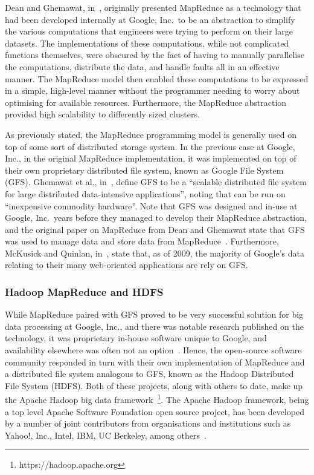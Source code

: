 \documentclass[a4paper,11pt]{article}
\begin{document}
Dean and Ghemawat, in~\cite{dean_mapreduce:_2008}, originally presented MapReduce as a technology that had been
developed internally at Google, Inc.\ to be an abstraction to simplify the various computations that engineers were
trying to perform on their large datasets. The implementations of these computations, while not complicated functions
themselves, were obscured by the fact of having to manually parallelise the computations, distribute the data, and
handle faults all in an effective manner. The MapReduce model then enabled these computations to be expressed in a
simple, high-level manner without the programmer needing to worry about optimising for available resources. Furthermore,
the MapReduce abstraction provided high scalability to differently sized clusters.

As previously stated, the MapReduce programming model is generally used on top of some sort of distributed storage
system. In the previous case at Google, Inc., in the original MapReduce implementation, it was implemented on top of
their own proprietary distributed file system, known as Google File System (GFS). Ghemawat et al.,
in~\cite{ghemawat_google_2003}, define GFS to be a ``scalable distributed file system for large distributed data-intensive
applications'', noting that can be run on ``inexpensive commodity hardware''. Note that GFS was designed and in-use
at Google, Inc.\ years before they managed to develop their MapReduce abstraction, and the original paper on MapReduce
from Dean and Ghemawat state that GFS was used to manage data and store data from MapReduce~\cite{dean_mapreduce:_2008}.
Furthermore, McKusick and Quinlan, in~\cite{mckusick2009gfs}, state that, as of 2009, the majority of Google's data
relating to their many web-oriented applications are rely on GFS.



\subsubsection{Hadoop MapReduce and HDFS} %
\label{ssub:hadoop_mapreduce_and_hdfs}

While MapReduce paired with GFS proved to be very successful solution for big data processing at Google, Inc., and
there was notable research published on the technology, it was proprietary in-house software unique to Google, and
availability elsewhere was often not an option~\cite{grossman2009varieties}. Hence, the open-source software community
responded in turn with their own implementation of MapReduce and a distributed file system analogous to GFS, known as the
Hadoop Distributed File System (HDFS). Both of these projects, along with others to date, make up the Apache Hadoop
big data framework~\footnote{https://hadoop.apache.org}. The Apache Hadoop framework, being a top level Apache Software
Foundation open source project, has been developed by a number of joint contributors from organisations and institutions
such as Yahoo!, Inc., Intel, IBM, UC Berkeley, among others~\cite{hadoop_committers}.
\end{document}
